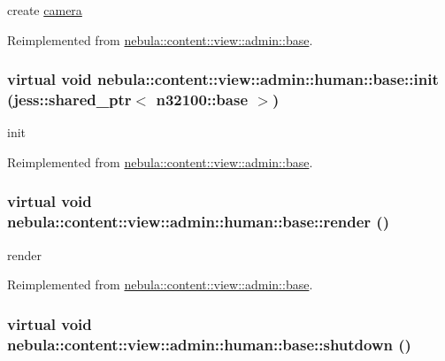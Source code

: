 create \hyperlink{classnebula_1_1content_1_1camera}{camera} 

Reimplemented from \hyperlink{classnebula_1_1content_1_1view_1_1admin_1_1base_ad1325929fa62c561c9546bf7b92c330d}{nebula::content::view::admin::base}.\hypertarget{classnebula_1_1content_1_1view_1_1admin_1_1human_1_1base_ac03c971a7f2769dfce37c70b97539768}{
\subsubsection[{init}]{\setlength{\rightskip}{0pt plus 5cm}virtual void nebula::content::view::admin::human::base::init (jess::shared\_\-ptr$<$ {\bf n32100::base} $>$)}}
\label{classnebula_1_1content_1_1view_1_1admin_1_1human_1_1base_ac03c971a7f2769dfce37c70b97539768}


init 

Reimplemented from \hyperlink{classnebula_1_1content_1_1view_1_1admin_1_1base_a8226e4b40dd4752b5b88f868ac6185ca}{nebula::content::view::admin::base}.\hypertarget{classnebula_1_1content_1_1view_1_1admin_1_1human_1_1base_a9ac7c00ce4bc7f8a8de608ef2092fcd0}{
\subsubsection[{render}]{\setlength{\rightskip}{0pt plus 5cm}virtual void nebula::content::view::admin::human::base::render ()}}
\label{classnebula_1_1content_1_1view_1_1admin_1_1human_1_1base_a9ac7c00ce4bc7f8a8de608ef2092fcd0}


render 

Reimplemented from \hyperlink{classnebula_1_1content_1_1view_1_1admin_1_1base_a9bd1285f26e75372fd8c3cf1da848f29}{nebula::content::view::admin::base}.\hypertarget{classnebula_1_1content_1_1view_1_1admin_1_1human_1_1base_a0d6c670702266530dd1397debb8e4b8a}{
\subsubsection[{shutdown}]{\setlength{\rightskip}{0pt plus 5cm}virtual void nebula::content::view::admin::human::base::shutdown ()}}
\label{classnebula_1_1content_1_1view_1_1admin_1_1human_1_1base_a0d6c670702266530dd1397debb8e4b8a}


